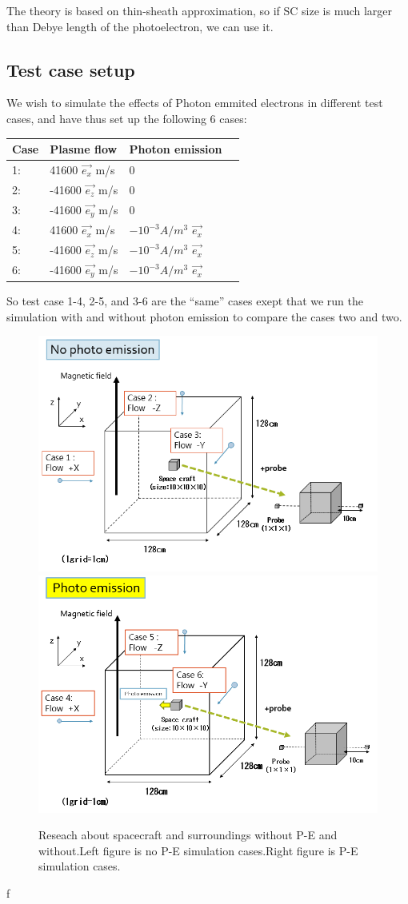 The theory is based on thin-sheath approximation, so if SC size is much larger than Debye length of the photoelectron, we can use it.\\

\subsection{Test case setup}

We wish to simulate the effects of Photon emmited electrons in different test cases, and have thus set up the following
6 cases:
\begin{center}
    \begin{tabular}{ | l | l | l | p{5cm} |}
    \hline
    Case & Plasme flow & Photon emission  \\ \hline
     1: & 41600 $\vec{e_x}$ m/s  & 0 \\ \hline
     2: & -41600 $\vec{e_z}$ m/s & 0 \\ \hline
     3: & -41600 $\vec{e_y}$ m/s & 0 \\ \hline
     4: & 41600 $\vec{e_x}$ m/s & $-10^{-3} A/m^{3}$ $\vec{e_x}$\\ \hline
     5: & -41600 $\vec{e_z}$ m/s & $-10^{-3} A/m^{3}$ $\vec{e_x}$\\ \hline
     6: & -41600 $\vec{e_y}$ m/s & $-10^{-3} A/m^{3}$  $\vec{e_x}$\\
    \hline
    \end{tabular}
\end{center}

So test case 1-4, 2-5, and 3-6 are the ``same'' cases exept that we run the simulation with and without
photon emission to compare the cases two and two. 

\begin{figure}
        \includegraphics[width = 0.5 \textwidth]{images/picture_simulation1.png}
        \includegraphics[width = 0.5 \textwidth]{images/picture_simulation2-2.png}
        \caption{Reseach about spacecraft and surroundings without P-E and without.Left figure is no P-E simulation cases.Right figure is P-E simulation cases.}
    \end{figure}  f

